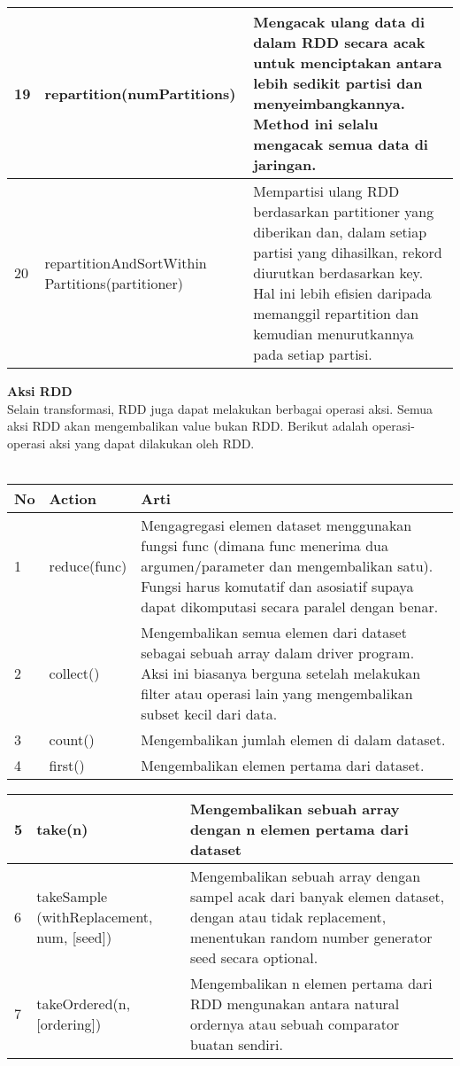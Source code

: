 \documentclass[a4paper,twoside]{article}
\begin{document}
\begin{enumerate}
\begin{tabular}{|p{}|p{}|p{}|}
\hline
19 & repartition(numPartitions) & Mengacak ulang data di dalam RDD secara acak untuk menciptakan antara lebih sedikit partisi dan menyeimbangkannya. Method ini selalu mengacak semua data di jaringan.\\ 
\hline
20 & repartitionAndSortWithin Partitions(partitioner) & Mempartisi ulang RDD berdasarkan partitioner yang diberikan dan, dalam setiap partisi yang dihasilkan, rekord diurutkan berdasarkan key. Hal ini lebih efisien daripada memanggil repartition dan kemudian menurutkannya pada setiap partisi. \\ 
\hline
\end{tabular} 


\textbf{Aksi RDD}\\
Selain transformasi, RDD juga dapat melakukan berbagai operasi aksi. Semua aksi RDD akan mengembalikan value bukan RDD. Berikut adalah operasi-operasi aksi yang dapat dilakukan oleh RDD.\\\\
\begin{tabular}{|p{}|p{}|p{}|}
\hline 
No & Action & Arti \\ 
\hline 
1 & reduce(func) & Mengagregasi elemen dataset menggunakan fungsi func (dimana func menerima dua argumen/parameter dan mengembalikan satu). Fungsi harus komutatif dan asosiatif supaya dapat dikomputasi secara paralel dengan benar. \\ 
\hline 
2 & collect() & Mengembalikan semua elemen dari dataset sebagai sebuah array dalam driver program. Aksi ini biasanya berguna setelah melakukan filter atau operasi lain yang mengembalikan subset kecil dari data. \\ 
\hline 
3 & count() & Mengembalikan jumlah elemen di dalam dataset. \\ 
\hline 
4 & first() & Mengembalikan elemen pertama dari dataset. \\ 
\hline
\end{tabular}
\begin{tabular}{|p{}|p{}|p{}|}
\hline
5 & take(n) & Mengembalikan sebuah array dengan n elemen pertama dari dataset \\ 
\hline 
6 & takeSample (withReplacement, num, [seed]) & Mengembalikan sebuah array dengan sampel acak dari banyak elemen dataset, dengan atau tidak replacement, menentukan random number generator seed secara optional. \\ 
\hline
7 & takeOrdered(n, [ordering]) & Mengembalikan n elemen pertama dari RDD mengunakan antara natural ordernya atau sebuah comparator buatan sendiri. \\ 

\end{tabular}
\end{enumerate}
\end{document}

